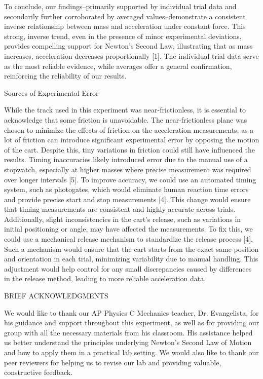 To conclude, our findings–primarily supported by individual trial data and secondarily further corroborated by averaged values–demonstrate a consistent inverse relationship between mass and acceleration under constant force. This strong, inverse trend, even in the presence of minor experimental deviations, provides compelling support for Newton’s Second Law, illustrating that as mass increases, acceleration decreases proportionally [1]. The individual trial data serve as the most reliable evidence, while averages offer a general confirmation, reinforcing the reliability of our results.


Sources of Experimental Error


While the track used in this experiment was near-frictionless, it is essential to acknowledge that some friction is unavoidable. The near-frictionless plane was chosen to minimize the effects of friction on the acceleration measurements, as a lot of friction can introduce significant experimental error by opposing the motion of the cart. Despite this, tiny variations in friction could still have influenced the results.
Timing inaccuracies likely introduced error due to the manual use of a stopwatch, especially at higher masses where precise measurement was required over longer intervals [5]. To improve accuracy, we could use an automated timing system, such as photogates, which would eliminate human reaction time errors and provide precise start and stop measurements [4]. This change would ensure that timing measurements are consistent and highly accurate across trials. 
Additionally, slight inconsistencies in the cart’s release, such as variations in initial positioning or angle, may have affected the measurements. To fix this, we could use a mechanical release mechanism to standardize the release process [4]. Such a mechanism would ensure that the cart starts from the exact same position and orientation in each trial, minimizing variability due to manual handling. This adjustment would help control for any small discrepancies caused by differences in the release method, leading to more reliable acceleration data.






BRIEF ACKNOWLEDGMENTS


We would like to thank our AP Physics C Mechanics teacher, Dr. Evangelista, for his guidance and support throughout this experiment, as well as for providing our group with all the necessary materials from his classroom. His assistance helped us better understand the principles underlying Newton’s Second Law of Motion and how to apply them in a practical lab setting. We would also like to thank our peer reviewers for helping us to revise our lab and providing valuable, constructive feedback. 


